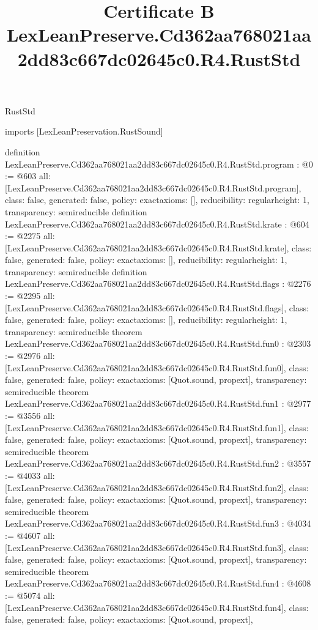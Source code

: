 \begin{lexlean}{RustStd}
\title{Certificate B LexLeanPreserve.Cd362aa768021aa2dd83c667dc02645c0.R4.RustStd}
\begin{coremodule}
imports [LexLeanPreservation.RustSound]

definition LexLeanPreserve.Cd362aa768021aa2dd83c667dc02645c0.R4.RustStd.program : @0 := @603 {
  all: [LexLeanPreserve.Cd362aa768021aa2dd83c667dc02645c0.R4.RustStd.program],
  class: false,
  generated: false,
  policy: exact{axioms: []},
  reducibility: regular{height: 1},
  transparency: semireducible
}
definition LexLeanPreserve.Cd362aa768021aa2dd83c667dc02645c0.R4.RustStd.krate : @604 := @2275 {
  all: [LexLeanPreserve.Cd362aa768021aa2dd83c667dc02645c0.R4.RustStd.krate],
  class: false,
  generated: false,
  policy: exact{axioms: []},
  reducibility: regular{height: 1},
  transparency: semireducible
}
definition LexLeanPreserve.Cd362aa768021aa2dd83c667dc02645c0.R4.RustStd.flags : @2276 := @2295 {
  all: [LexLeanPreserve.Cd362aa768021aa2dd83c667dc02645c0.R4.RustStd.flags],
  class: false,
  generated: false,
  policy: exact{axioms: []},
  reducibility: regular{height: 1},
  transparency: semireducible
}
theorem LexLeanPreserve.Cd362aa768021aa2dd83c667dc02645c0.R4.RustStd.fun0 : @2303 := @2976 {
  all: [LexLeanPreserve.Cd362aa768021aa2dd83c667dc02645c0.R4.RustStd.fun0],
  class: false,
  generated: false,
  policy: exact{axioms: [Quot.sound, propext]},
  transparency: semireducible
}
theorem LexLeanPreserve.Cd362aa768021aa2dd83c667dc02645c0.R4.RustStd.fun1 : @2977 := @3556 {
  all: [LexLeanPreserve.Cd362aa768021aa2dd83c667dc02645c0.R4.RustStd.fun1],
  class: false,
  generated: false,
  policy: exact{axioms: [Quot.sound, propext]},
  transparency: semireducible
}
theorem LexLeanPreserve.Cd362aa768021aa2dd83c667dc02645c0.R4.RustStd.fun2 : @3557 := @4033 {
  all: [LexLeanPreserve.Cd362aa768021aa2dd83c667dc02645c0.R4.RustStd.fun2],
  class: false,
  generated: false,
  policy: exact{axioms: [Quot.sound, propext]},
  transparency: semireducible
}
theorem LexLeanPreserve.Cd362aa768021aa2dd83c667dc02645c0.R4.RustStd.fun3 : @4034 := @4607 {
  all: [LexLeanPreserve.Cd362aa768021aa2dd83c667dc02645c0.R4.RustStd.fun3],
  class: false,
  generated: false,
  policy: exact{axioms: [Quot.sound, propext]},
  transparency: semireducible
}
theorem LexLeanPreserve.Cd362aa768021aa2dd83c667dc02645c0.R4.RustStd.fun4 : @4608 := @5074 {
  all: [LexLeanPreserve.Cd362aa768021aa2dd83c667dc02645c0.R4.RustStd.fun4],
  class: false,
  generated: false,
  policy: exact{axioms: [Quot.sound, propext]},
}
\end{coremodule}
\end{lexlean}
